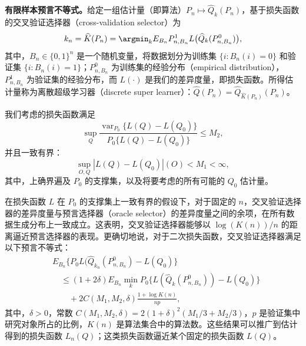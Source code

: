 \begin{sourcebox}
\noindent\textbf{有限样本预言不等式。}给定一组估计量（即算法）$P_n\mapsto\widehat Q_k(P_n)$，基于损失函数的交叉验证选择器（cross-validation selector）为
\[
 k_n=\widehat K(P_n)=\argmin_k E_{B_n}P^1_{n,B_n}L\bigl(\widehat Q_k(P^0_{n,B_n})\bigr),
\]
其中，$B_n\in\{0,1\}^n$ 是一个随机变量，将数据划分为训练集 $\{i:B_n(i)=0\}$ 和验证集 $\{i:B_n(i)=1\}$；$P^0_{n,B_n}$ 为训练集的经验分布（empirical distribution），$P^1_{n,B_n}$ 为验证集的经验分布，而 $L(\cdot)$ 是我们的差异度量，即损失函数。所得估计量称为离散超级学习器（discrete super learner）：$\widehat Q(P_n)=\widehat Q_{\widehat K(P_n)}(P_n)$。

我们考虑的损失函数满足
\[
 \sup_Q
 \frac{\operatorname{var}_{P_0}\{L(Q)-L(Q_0)\}}
      {P_0\{L(Q)-L(Q_0)\}}
 \leq M_2,
\]
并且一致有界：
\[
 \sup_{O,Q}|L(Q)-L(Q_0)|(O)<M_1<\infty,
\]
其中，上确界遍及 $P_0$ 的支撑集，以及将要考虑的所有可能的 $Q_0$ 估计量。

在损失函数 $L$ 在 $P_0$ 的支撑集上一致有界的假设下，对于固定的 $n$，交叉验证选择器的差异度量与预言选择器（oracle selector）的差异度量之间的余项，在所有数据生成分布上一致成立。这表明，交叉验证选择器能够以 $\log(K(n))/n$ 的距离逼近预言选择器的表现。更确切地说，对于二次损失函数，交叉验证选择器满足以下预言不等式：
\[
 \begin{aligned}
 &E_{B_n}\bigl\{P_0L(\widehat Q_{k_n}(P^0_{n,B_n})-L(Q_0)\bigr\}\\
 &\quad\leq(1+2\delta)E_{B_n}\min_k
 P_0\bigl\{L(\widehat Q_k(P^0_{n,B_n}))-L(Q_0)\bigr\}\\
 &\qquad{}+2C(M_1,M_2,\delta)\frac{1+\log K(n)}{np},
 \end{aligned}
\]
其中，$\delta>0$，常数 $C(M_1,M_2,\delta)=2(1+\delta)^2(M_1/3+M_2/3)$，$p$ 是验证集中研究对象所占的比例，$K(n)$ 是算法集合中的算法数。这些结果可以推广到估计得到的损失函数 $L_n(Q)$；这类损失函数逼近某个固定的损失函数 $L(Q)$。
\end{sourcebox}
